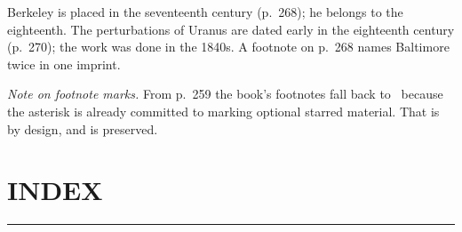 \documentclass[11pt]{book}
\theoremstyle{bkplain}
\theoremstyle{XIplainnote}
\theoremstyle{bkplain}
\theoremstyle{bkplain}
\begin{document}
\begin{erratalist}
\item[Chapter 16 \quad Philosophy of mathematics]
Berkeley is placed in the seventeenth century (p.~268); he belongs to the
eighteenth. The perturbations of Uranus are dated early in the eighteenth
century (p.~270); the work was done in the 1840s. A footnote on p.~268 names
Baltimore twice in one imprint.

\end{erratalist}

\vspace{1em}
\noindent\emph{Note on footnote marks.} From p.~259 the book's footnotes fall
back to \dag\ because the asterisk is already committed to marking optional
starred material. That is by design, and is preserved.
\clearpage
\setcounter{theorem}{0}\setcounter{definition}{0}\setcounter{construction}{0}\setcounter{exgroup}{0}\setcounter{footnote}{0}
\setcounter{chapter}{19}

\chapter*{\raggedleft\Huge INDEX}
\vspace{-1em}\noindent\rule{\linewidth}{0.6pt}\vspace{1em}
\end{document}
